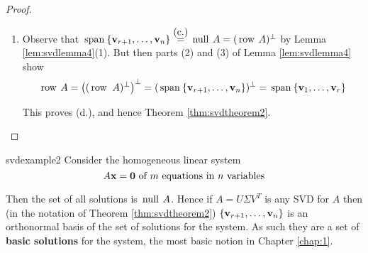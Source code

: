 \begin{proof}
\begin{enumerate}
\begin{enumerate}[label=\alph*.]
\noindent Observe that each $\lambda_{j}$ is an eigenvalue of $\Sigma^{T}\Sigma $ with eigenvector $\vect{e}_{j}=$ column $j$ of $I_{n}$. Thus $\vect{v}_{j}=V\vect{e}_{j}$ for each $j$. As $A^{T}A=V\Sigma^{T}\Sigma V^{T}$ (proof of Lemma \ref{lem:svdlemma3}), we obtain 
\begin{equation*}
(A^{T}A)\vect{v}_{j}=(V\Sigma^{T}\Sigma V^{T})(V\vect{e}_{j})=V(\Sigma^{T}\Sigma \vect{e}_{j})=V\left( \lambda_{j}^{2}\vect{e}_{j}\right) =\lambda_{j}^{2}V\vect{e}_{j}=\lambda_{j}^{2}\vect{v}_{j} 
\end{equation*}

\noindent for $1\leq j\leq n$. Thus each $\vect{v}_{j}$ is an eigenvector
of $A^{T}A$ corresponding to $\lambda_{j}^{2}$. But then
\begin{equation*}
\vectlength A\vect{v}_{j}\vectlength^{2}=(A\vect{v}_{j})^{T}A\vect{v}_{j}=\vect{v}_{j}^{T}(A^{T}A\vect{v}_{j})=\vect{v}_{j}^{T}(\lambda _{j}^{2}\vect{v}_{j})=\lambda_{j}^{2}\vectlength \vect{v}_{j}\vectlength^{2}=\lambda_{j}^{2}\quad \mbox{for } i=1,\ldots ,n
\end{equation*}

\noindent In particular, $A\vect{v}_{j}=\vect{0}$ whenever $j>r$, so $\vect{v}_{j}\in \func{null}A$ if $j>r$, as desired. This proves (c).

\item Observe that $\thinspace\operatorname{span\medspace}\{\textbf{v}_{r+1},\ldots ,\textbf{v}_{n}\}\overset{\mbox{(c.)}}{=}\thinspace\operatorname{null\medspace}A=(\thinspace\operatorname{row\medspace}A)^{\perp}$ by
Lemma \ref{lem:svdlemma4}(1). But then parts (2) and (3) of Lemma \ref{lem:svdlemma4} show 
\begin{equation*}
\thinspace\operatorname{row\medspace}A=\left((\thinspace\operatorname{row\medspace}\,A)^{\perp}\right)^{\perp}=(\thinspace\operatorname{span\medspace}\{\textbf{v}_{r+1},\ldots ,\textbf{v}_{n}\})^{\perp}=\thinspace\operatorname{span\medspace}\{\textbf{v}_{1},\ldots ,\textbf{v}_{r}\}
\end{equation*}

\noindent This proves (d.), and hence Theorem \ref{thm:svdtheorem2}.
\end{enumerate}
\end{enumerate}
\end{proof}

\begin{example}{}{svdexample2}
Consider the homogeneous linear system 
\begin{equation*}
A\textbf{x}=\textbf{0} \mbox{ of } m \mbox{ equations in } n \mbox{ variables}
\end{equation*}

\noindent Then the set of all solutions is $\thinspace\operatorname{null\medspace} A$. 
Hence if $A=U\Sigma V^{T}$ is any SVD for $A$ then (in the notation of Theorem \ref{thm:svdtheorem2}) $\{\textbf{v}_{r+1},\ldots ,\textbf{v}_{n}\}$ is an orthonormal basis of the set of solutions for the system. As such they are a set of \textbf{basic solutions} for the system, the most basic notion in Chapter \ref{chap:1}.
\end{example}

